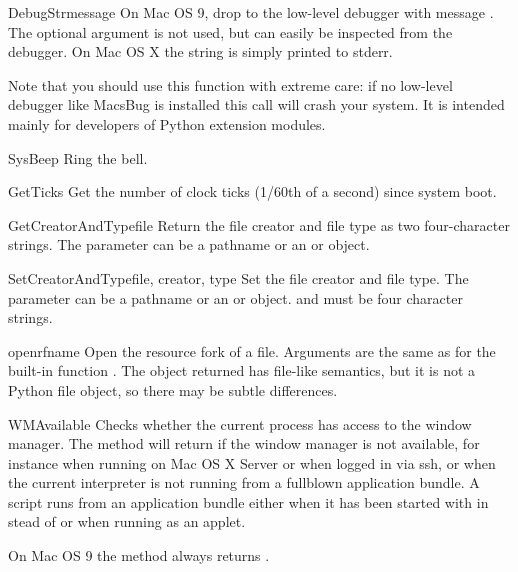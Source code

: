 \begin{funcdesc}{DebugStr}{message }
On Mac OS 9, drop to the low-level debugger with message . The
optional  argument is not used, but can easily be
inspected from the debugger. On Mac OS X the string is simply printed
to stderr.

Note that you should use this function with extreme care: if no
low-level debugger like MacsBug is installed this call will crash your
system. It is intended mainly for developers of Python extension
modules.
\end{funcdesc}

\begin{funcdesc}{SysBeep}{}
Ring the bell.
\end{funcdesc}

\begin{funcdesc}{GetTicks}{}
Get the number of clock ticks (1/60th of a second) since system boot.
\end{funcdesc}

\begin{funcdesc}{GetCreatorAndType}{file}
Return the file creator and file type as two four-character strings.
The  parameter can be a pathname or an  or 
 object.
\end{funcdesc}

\begin{funcdesc}{SetCreatorAndType}{file, creator, type}
Set the file creator and file type.
The  parameter can be a pathname or an  or 
 object.  and  must be four character
strings.
\end{funcdesc}

\begin{funcdesc}{openrf}{name }
Open the resource fork of a file. Arguments are the same as for the
built-in function . The object returned has file-like
semantics, but it is not a Python file object, so there may be subtle
differences.
\end{funcdesc}

\begin{funcdesc}{WMAvailable}{}
Checks whether the current process has access to the window manager.
The method will return  if the window manager is not available,
for instance when running on Mac OS X Server or when logged in via ssh,
or when the current interpreter is not running from a fullblown application
bundle. A script runs from an application bundle either when it has been
started with  in stead of  or when running 
as an applet.

On Mac OS 9 the method always returns .
\end{funcdesc}
